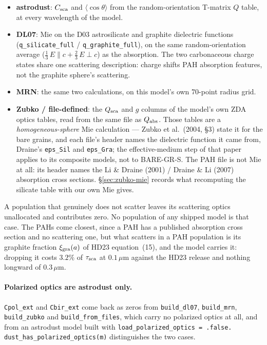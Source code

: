 \documentclass{my_memo}
\newcommand{\code}[1]{\texttt{#1}}
\begin{document}
\begin{itemize}
\item \textbf{astrodust}: $C_{\rm sca}$ and $\langle\cos\theta\rangle$ from the
      random-orientation T-matrix $Q$ table, at every wavelength of the model.
\item \textbf{DL07}: Mie on the D03 astrosilicate and graphite dielectric
      functions (\code{q\_silicate\_full} / \code{q\_graphite\_full}), on the
      same random-orientation average ($\tfrac13\,E\!\parallel\!c +
      \tfrac23\,E\!\perp\!c$) as the absorption. The two carbonaceous charge
      states share one scattering description: charge shifts PAH absorption
      features, not the graphite sphere's scattering.
\item \textbf{MRN}: the same two calculations, on this model's own 70-point
      radius grid.
\item \textbf{Zubko / file-defined}: the $Q_{\rm sca}$ and $g$ columns of the
      model's own ZDA optics tables, read from the same file as $Q_{\rm abs}$.
      Those tables are a \emph{homogeneous-sphere} Mie calculation --- Zubko
      et al.\ (2004, \S3) state it for the bare grains, and each file's header
      names the dielectric function it came from, Draine's \code{eps\_Sil} and
      \code{eps\_Gra}; the effective-medium step of that paper applies to its
      composite models, not to BARE-GR-S. The PAH file is not Mie at all: its
      header names the Li \& Draine (2001) / Draine \& Li (2007) absorption
      cross sections. \S\ref{sec:zubko-mie} records what recomputing the
      silicate table with our own Mie gives.
\end{itemize}

\noindent A population that genuinely does not scatter leaves its scattering
optics unallocated and contributes zero. No population of any shipped model is
that case. The PAHs come closest, since a PAH has a published absorption cross
section and no scattering one, but what scatters in a PAH population is its
graphite fraction $\xi_{\rm gra}(a)$ of HD23 equation~(15), and the model
carries it: dropping it costs $3.2\%$ of $\tau_{\rm sca}$ at $0.1\,\mu$m
against the HD23 release and nothing longward of $0.3\,\mu$m.

\paragraph{Polarized optics are astrodust only.} \code{Cpol\_ext} and
\code{Cbir\_ext} come back as zeros from \code{build\_dl07},
\code{build\_mrn},
\code{build\_zubko} and \code{build\_from\_files}, which carry no polarized
optics at all, and from an astrodust model built with
\code{load\_polarized\_optics = .false.}
\code{dust\_has\_polarized\_optics(m)} distinguishes the two cases.
\end{document}
